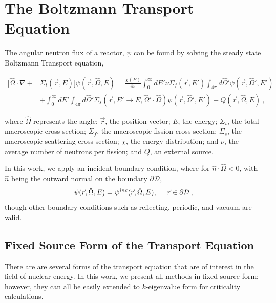 \section{The Boltzmann Transport Equation}
The angular neutron flux of a reactor, $\psi$ can be found by solving the steady state Boltzmann Transport equation,

\begin{equation}
\begin{split}
  [\hat{\Omega} \cdot \nabla + &\Sigma_t(\vec{r}, E)]\psi(\vec{r}, \hat{\Omega}, E) = \frac{\chi(E)}{4\pi} \int_0^\infty dE' \nu \Sigma_{f}(\vec{r}, E') \int_{4\pi} d\hat{\Omega}'\psi(\vec{r}, \hat{\Omega}', E') \\   &+ \int_0^\infty dE' \int_{4\pi} d\hat{\Omega}' \Sigma_s(\vec{r}, E' \rightarrow E, \hat{\Omega}' \cdot \hat{\Omega})\psi(\vec{r}, \hat{\Omega}', E') + Q(\vec{r}, \hat{\Omega}, E)   \:,
\end{split}
\label{eq:transport}
\end{equation}

where $\hat{\Omega}$ represents the angle; $\vec{r}$, the position vector; $E$, the energy; $\Sigma_t$, the total macroscopic cross-section; $\Sigma_f$, the macroscopic fission cross-section; $\Sigma_s$, the macroscopic scattering cross section; $\chi$, the energy distribution; and $\nu$, the average number of neutrons per fission; and $Q$, an external source.  


In this work, we apply an incident boundary condition, where for $\hat{n} \cdot \hat{\Omega} < 0$, with $\hat{n}$ being the outward normal on the boundary $\partial \mathcal{D}$,
\begin{equation}
    \psi(\vec{r}, \hat{\Omega}, E) = \psi^{inc}(\vec{r}, \hat{\Omega}, E), \hspace{5mm} \vec{r} \in \partial \mathcal{D}\:,
\end{equation}
though other boundary conditions such as reflecting, periodic, and vacuum are valid.

\subsection{Fixed Source Form of the Transport Equation}
There are are several forms of the transport equation that are of interest in the field of nuclear energy. In this work, we present all methods in fixed-source form; however, they can all be easily extended to $k$-eigenvalue form for criticality calculations. 

